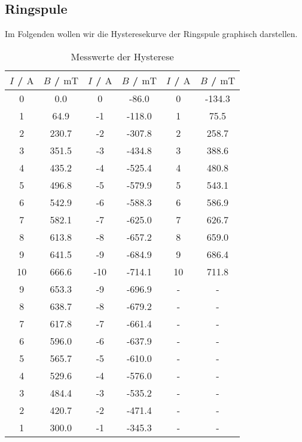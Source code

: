 \subsection{Ringspule}

Im Folgenden wollen wir die Hysteresekurve der Ringspule graphisch darstellen.

\begin{table}
\centering
\caption{Messwerte der Hysterese}
\begin{tabular}{c c c c c c}
  \toprule
  $I$ / $\unit{\ampere}$ &  $B$ / $\unit{\milli\tesla}$ &  $I$ / $\unit{\ampere}$ &  $B$ / $\unit{\milli\tesla}$ &  $I$ / $\unit{\ampere}$ &  $B$ / $\unit{\milli\tesla}$\\
  \midrule
     0 &        0.0 &         0 &      -86.0 &   0 &     -134.3 \\
     1 &       64.9 &        -1 &     -118.0 &   1 &       75.5 \\
     2 &      230.7 &        -2 &     -307.8 &   2 &      258.7 \\
     3 &      351.5 &        -3 &     -434.8 &   3 &      388.6 \\
     4 &      435.2 &        -4 &     -525.4 &   4 &      480.8 \\
     5 &      496.8 &        -5 &     -579.9 &   5 &      543.1 \\
     6 &      542.9 &        -6 &     -588.3 &   6 &      586.9 \\
     7 &      582.1 &        -7 &     -625.0 &   7 &      626.7 \\
     8 &      613.8 &        -8 &     -657.2 &   8 &      659.0 \\
     9 &      641.5 &        -9 &     -684.9 &   9 &      686.4 \\
    10 &      666.6 &       -10 &     -714.1 &  10 &      711.8 \\
     9 &      653.3 &        -9 &     -696.9 &  -  &        -     \\
     8 &      638.7 &        -8 &     -679.2 &  -  &        -     \\
     7 &      617.8 &        -7 &     -661.4 &  -  &        -     \\
     6 &      596.0 &        -6 &     -637.9 &  -  &        -     \\
     5 &      565.7 &        -5 &     -610.0 &  -  &        -     \\
     4 &      529.6 &        -4 &     -576.0 &  -  &        -     \\
     3 &      484.4 &        -3 &     -535.2 &  -  &        -     \\
     2 &      420.7 &        -2 &     -471.4 &  -  &        -     \\
     1 &      300.0 &        -1 &     -345.3 &  -  &        -     \\
  \bottomrule
  \end{tabular}
\end{table}

